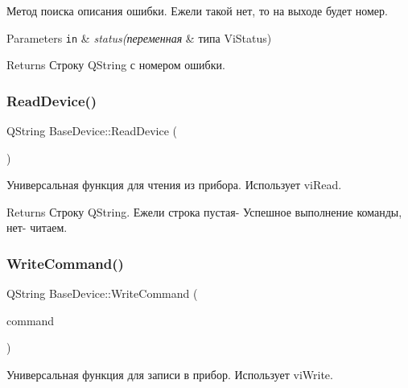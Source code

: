 Метод поиска описания ошибки. Ежели такой нет, то на выходе будет номер. 


\begin{DoxyParams}[1]{Parameters}
\mbox{\tt in}  & {\em status(переменная} & типа Vi\+Status) \\
\hline
\end{DoxyParams}
\begin{DoxyReturn}{Returns}
Строку Q\+String с номером ошибки. 
\end{DoxyReturn}
\hypertarget{class_base_device_ac73856a92b58fd249e41bed55cee55ef}{}\label{class_base_device_ac73856a92b58fd249e41bed55cee55ef} 
\subsubsection{\texorpdfstring{Read\+Device()}{ReadDevice()}}
{\footnotesize\ttfamily Q\+String Base\+Device\+::\+Read\+Device (\begin{DoxyParamCaption}{ }\end{DoxyParamCaption})\hspace{0.3cm}{\ttfamily [protected]}}



Универсальная функция для чтения из прибора. Использует vi\+Read. 

\begin{DoxyReturn}{Returns}
Строку Q\+String. Ежели строка пустая-\/ Успешное выполнение команды, нет-\/ читаем. 
\end{DoxyReturn}
\hypertarget{class_base_device_a8e7de3e063defc28d0bd3d850099d4a5}{}\label{class_base_device_a8e7de3e063defc28d0bd3d850099d4a5} 
\subsubsection{\texorpdfstring{Write\+Command()}{WriteCommand()}}
{\footnotesize\ttfamily Q\+String Base\+Device\+::\+Write\+Command (\begin{DoxyParamCaption}\item[{Q\+String}]{command }\end{DoxyParamCaption})\hspace{0.3cm}{\ttfamily [protected]}}



Универсальная функция для записи в прибор. Использует vi\+Write. 


